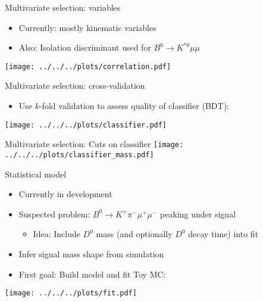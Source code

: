 \documentclass[compress,aspectratio=43]{beamer}
\begin{document}
\begin{frame}{Multivariate selection: variables}
  \begin{itemize}
    \item Currently: mostly kinematic variables
    \item Also: Isolation discriminant used for $B^0\to K^{*0}\mu\mu$
  \end{itemize}
  \centering
  \texttt{[image: ../../../plots/correlation.pdf]}
\end{frame}

\begin{frame}{Multivariate selection: cross-validation}
  \begin{itemize}
    \item Use $k$-fold validation to assess quality of classifier (BDT):
  \end{itemize}
  \centering
  \texttt{[image: ../../../plots/classifier.pdf]}
\end{frame}

\begin{frame}{Multivariate selection: Cuts on classifier}
  \centering
  \texttt{[image: ../../../plots/classifier\_mass.pdf]}
\end{frame}

\begin{frame}{Statistical model}
  \begin{itemize}
    \item Currently in development
    \item Suspected problem: $B^0\to K^+\pi^-\mu^+\mu^-$ peaking under signal
      \begin{itemize}
        \item Idea: Include $D^0$ mass (and optionally $D^0$ decay time) into fit 
      \end{itemize}
    \item Infer signal mass shape from simulation
    \item First goal: Build model and fit Toy MC:
  \end{itemize}
  \centering
  \texttt{[image: ../../../plots/fit.pdf]}
\end{frame}
\end{document}
